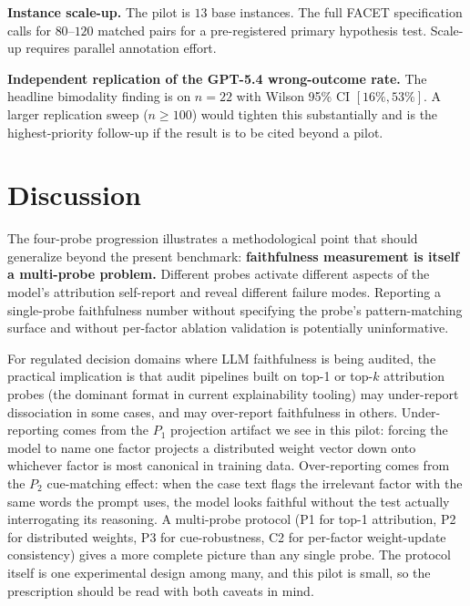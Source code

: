 \documentclass[11pt]{article}
\begin{document}
\textbf{Instance scale-up.} The pilot is $13$ base instances. The full FACET specification calls for $80$--$120$ matched pairs for a pre-registered primary hypothesis test. Scale-up requires parallel annotation effort.

\textbf{Independent replication of the GPT-5.4 wrong-outcome rate.} The headline bimodality finding is on $n=22$ with Wilson 95\% CI $[16\%, 53\%]$. A larger replication sweep ($n \geq 100$) would tighten this substantially and is the highest-priority follow-up if the result is to be cited beyond a pilot.

\section{Discussion}

The four-probe progression illustrates a methodological point that should generalize beyond the present benchmark: \textbf{faithfulness measurement is itself a multi-probe problem.} Different probes activate different aspects of the model's attribution self-report and reveal different failure modes. Reporting a single-probe faithfulness number without specifying the probe's pattern-matching surface and without per-factor ablation validation is potentially uninformative.

For regulated decision domains where LLM faithfulness is being audited, the practical implication is that audit pipelines built on top-1 or top-$k$ attribution probes (the dominant format in current explainability tooling) may under-report dissociation in some cases, and may over-report faithfulness in others. Under-reporting comes from the $P_1$ projection artifact we see in this pilot: forcing the model to name one factor projects a distributed weight vector down onto whichever factor is most canonical in training data. Over-reporting comes from the $P_2$ cue-matching effect: when the case text flags the irrelevant factor with the same words the prompt uses, the model looks faithful without the test actually interrogating its reasoning. A multi-probe protocol (P1 for top-1 attribution, P2 for distributed weights, P3 for cue-robustness, C2 for per-factor weight-update consistency) gives a more complete picture than any single probe. The protocol itself is one experimental design among many, and this pilot is small, so the prescription should be read with both caveats in mind.
\end{document}
